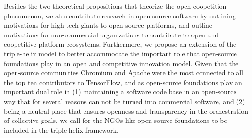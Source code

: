 \documentclass[CHICAGO,Times1COL]{WileyNJDv5} %
\begin{document}
 Besides the two theoretical propositions that theorize the open-coopetition phenomenon, we also contribute research in open-source software by outlining motivations for high-tech giants to open-source platforms, and outline motivations for non-commercial organizations to contribute to open and coopetitive platform ecosystems. Furthermore, we propose an extension of the triple-helix model to better accommodate the important role that open-source foundations play in an open and competitive innovation model. Given that the open-source communities Chromium and Apache were the most connected to all the top ten contributors to TensorFlow, and as open-source foundations play an important dual role in (1) maintaining a software code base in an open-source way that for several reasons can not be turned into commercial software, and (2) being a neutral place that ensures openness and transparency in the orchestration of collective goals, we call for the NGOs like open-source foundations to be included in the triple helix framework. 

 

 
 

 
\end{document}
